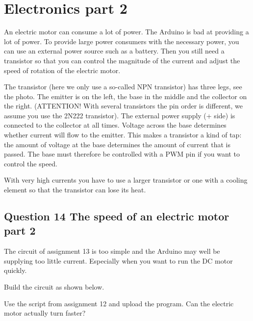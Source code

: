 \documentclass{arduino}
\begin{document}
\newpage

\section{Electronics part 2}




An electric motor can consume a lot of power. The Arduino is bad at providing a lot of power. To provide large power consumers with the necessary power, you can use an external power source such as a battery. Then you still need a transistor so that you can control the magnitude of the current and adjust the speed of rotation of the electric motor.

The transistor (here we only use a so-called NPN transistor) has three legs, see the photo. The emitter is on the left, the base in the middle and the collector on the right. (ATTENTION! With several transistors the pin order is different, we assume you use the 2N222 transistor). The external power supply (+ side) is connected to the collector at all times. Voltage across the base determines whether current will flow to the emitter. This makes a transistor a kind of tap: the amount of voltage at the base determines the amount of current that is passed. The base must therefore be controlled with a PWM pin if you want to control the speed.

With very high currents you have to use a larger transistor or one with a cooling element so that the transistor can lose its heat.

\subsection{Question 14 The speed of an electric motor part 2}

The circuit of assignment 13 is too simple and the Arduino may well be supplying too little current. Especially when you want to run the DC motor quickly.

\begin{alphalist}
\item Build the circuit as shown below.

\item Use the script from assignment 12 and upload the program. Can the electric motor actually turn faster?
\end{alphalist}
\end{document}
